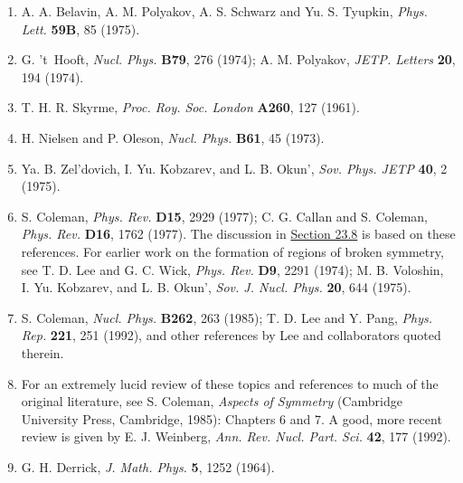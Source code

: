 
\begin{enumerate}
\item {}\label{ch23-ref-1}
A. A. Belavin, A. M. Polyakov, A. S. Schwarz and Yu. S. Tyupkin,
\emph{Phys. Lett.} \textbf{59B}, 85 (1975).

\item {}\label{ch23-ref-2}
G. 't~Hooft, \emph{Nucl. Phys.} \textbf{B79}, 276 (1974);
A. M. Polyakov, \emph{JETP. Letters} \textbf{20}, 194 (1974).

\item {}\label{ch23-ref-3}
T. H. R. Skyrme, \emph{Proc. Roy. Soc. London} \textbf{A260}, 127
(1961).

\item {}\label{ch23-ref-4}
H. Nielsen and P. Oleson, \emph{Nucl. Phys.} \textbf{B61}, 45 (1973).

\item {}\label{ch23-ref-5}
Ya. B. Zel'dovich, I. Yu. Kobzarev, and L. B. Okun',
\emph{Sov. Phys. JETP} \textbf{40}, 2 (1975).

\item {}\label{ch23-ref-6}
S. Coleman, \emph{Phys. Rev.} \textbf{D15}, 2929 (1977);
C. G. Callan and S. Coleman, \emph{Phys. Rev.} \textbf{D16}, 1762
(1977). The discussion in \hyperref[sec:23.8]{Section 23.8} is based on
these references. For earlier work on the formation of regions of broken
symmetry, see T. D. Lee and G. C. Wick, \emph{Phys. Rev.} \textbf{D9},
2291 (1974); M. B. Voloshin, I. Yu. Kobzarev, and L. B. Okun',
\emph{Sov. J. Nucl. Phys.} \textbf{20}, 644 (1975).

\item {}\label{ch23-ref-7}
S. Coleman, \emph{Nucl. Phys.} \textbf{B262}, 263 (1985);
T. D. Lee and Y. Pang, \emph{Phys. Rep.} \textbf{221}, 251 (1992),
and other references by Lee and collaborators quoted therein.

\item {}\label{ch23-ref-8}
For an extremely lucid review of these topics and references to much of
the original literature, see S. Coleman, \emph{Aspects of Symmetry}
(Cambridge University Press, Cambridge, 1985): Chapters 6 and 7. A good,
more recent review is given by E. J. Weinberg, \emph{Ann. Rev. Nucl.
Part. Sci.} \textbf{42}, 177 (1992).

\item {}\label{ch23-ref-9}
G. H. Derrick, \emph{J. Math. Phys.} \textbf{5}, 1252 (1964).


\end{enumerate}
